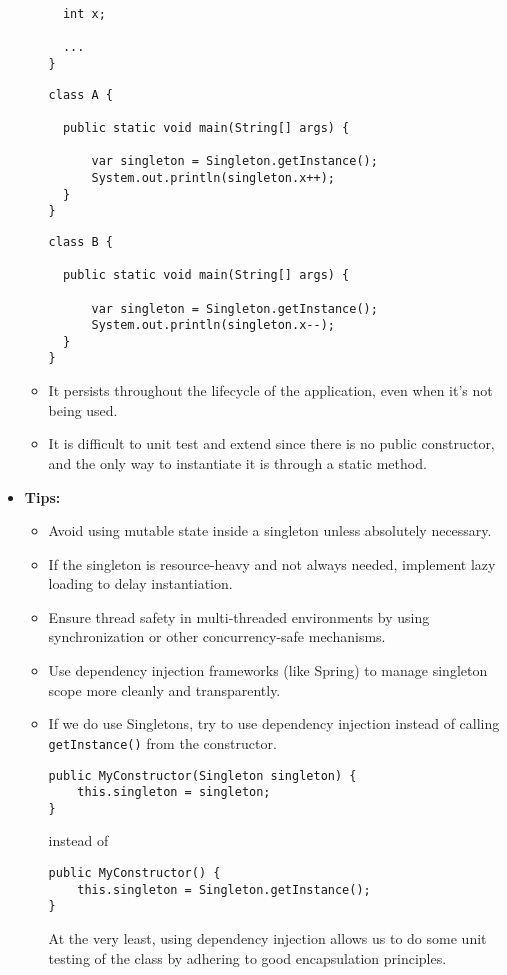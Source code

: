 \documentclass[12pt]{article}
\begin{document}
\begin{itemize}
\begin{itemize}
\begin{lstlisting}
  int x;

  ...
}
          \end{lstlisting}
                    \begin{lstlisting}
class A {

  public static void main(String[] args) {

      var singleton = Singleton.getInstance();
      System.out.println(singleton.x++);
  }
}
          \end{lstlisting}
                    \begin{lstlisting}
class B {

  public static void main(String[] args) {

      var singleton = Singleton.getInstance();
      System.out.println(singleton.x--);
  }
}
          \end{lstlisting}
              \item It persists throughout the lifecycle of the application, even when it's not being used.
              \item It is difficult to unit test and extend since there is no public constructor, and the only way to instantiate it is through a static method.
          \end{itemize}
    \item \textbf{Tips:}
          \begin{itemize}
              \item Avoid using mutable state inside a singleton unless absolutely necessary.
              \item If the singleton is resource-heavy and not always needed, implement lazy loading to delay instantiation.
              \item Ensure thread safety in multi-threaded environments by using synchronization or other concurrency-safe mechanisms.
              \item Use dependency injection frameworks (like Spring) to manage singleton scope more cleanly and transparently.
              \item If we do use Singletons, try to use dependency injection instead of calling \lstinline|getInstance()| from the constructor.
                    \begin{lstlisting}
public MyConstructor(Singleton singleton) {
    this.singleton = singleton;
}
        \end{lstlisting}
                    instead of
                    \begin{lstlisting}
public MyConstructor() {
    this.singleton = Singleton.getInstance();
}
        \end{lstlisting}
                    At the very least, using dependency injection allows us to do some unit testing of the class by adhering to good encapsulation principles.
          \end{itemize}
\end{itemize}
\end{document}
